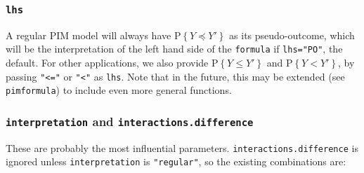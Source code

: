 \documentclass[12pt]{article}
\newcommand{\prob}[1]{\text{P}\left\{#1\right\}}
\newcommand{\leqs}{\preccurlyeq}
\newcommand{\pim}[1]{\texttt{#1}}%
\newcommand{\cd}[1]{\texttt{#1}}%
\begin{document}
\subsubsection{\cd{lhs}}
A regular PIM model will always have $\prob{Y \leqs Y' }$ as its pseudo-outcome, which will be the interpretation of the left hand side of the \cd{formula} if \cd{lhs="PO"}, the default. For other applications, we also provide $\prob{Y \leq Y' }$ and $\prob{Y < Y' }$, by passing \cd{"<="} or \cd{"<"} as \cd{lhs}. Note that in the future, this may be extended (see \pim{pimformula}) to include even more general functions.
\subsubsection{\cd{interpretation} and \cd{interactions.difference}}
These are probably the most influential parameters. \cd{interactions.difference} is ignored unless \cd{interpretation} is \cd{"regular"}, so the existing combinations are:
\end{document}
